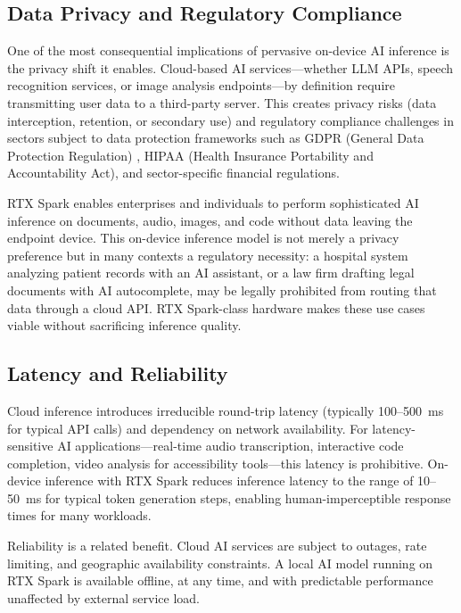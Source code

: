 \documentclass[conference]{IEEEtran}
\begin{document}
\subsection{Data Privacy and Regulatory Compliance}

One of the most consequential implications of pervasive on-device AI inference is the privacy shift it enables. Cloud-based AI services---whether LLM APIs, speech recognition services, or image analysis endpoints---by definition require transmitting user data to a third-party server. This creates privacy risks (data interception, retention, or secondary use) and regulatory compliance challenges in sectors subject to data protection frameworks such as GDPR (General Data Protection Regulation) \cite{gdpr2016}, HIPAA (Health Insurance Portability and Accountability Act), and sector-specific financial regulations.

RTX Spark enables enterprises and individuals to perform sophisticated AI inference on documents, audio, images, and code without data leaving the endpoint device. This on-device inference model is not merely a privacy preference but in many contexts a regulatory necessity: a hospital system analyzing patient records with an AI assistant, or a law firm drafting legal documents with AI autocomplete, may be legally prohibited from routing that data through a cloud API. RTX Spark-class hardware makes these use cases viable without sacrificing inference quality.

\subsection{Latency and Reliability}

Cloud inference introduces irreducible round-trip latency (typically 100--500~ms for typical API calls) and dependency on network availability. For latency-sensitive AI applications---real-time audio transcription, interactive code completion, video analysis for accessibility tools---this latency is prohibitive. On-device inference with RTX Spark reduces inference latency to the range of 10--50~ms for typical token generation steps, enabling human-imperceptible response times for many workloads.

Reliability is a related benefit. Cloud AI services are subject to outages, rate limiting, and geographic availability constraints. A local AI model running on RTX Spark is available offline, at any time, and with predictable performance unaffected by external service load.
\end{document}
